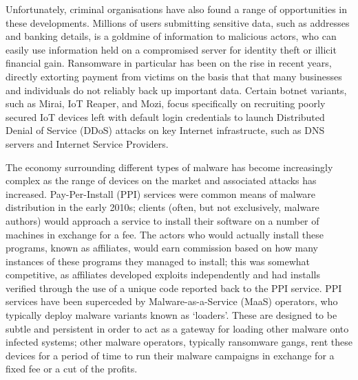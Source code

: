 \documentclass[10pt,sigconf]{acmart}
\begin{document}
Unfortunately, criminal organisations have also found a range of opportunities in these developments.
Millions of users submitting sensitive data, such as addresses and banking details, is a goldmine of information to malicious actors, who can easily use information held on a compromised server for identity theft or illicit financial gain.
Ransomware in particular has been on the rise in recent years, directly extorting payment from victims on the basis that that many businesses and individuals do not reliably back up important data.
Certain botnet variants, such as Mirai, IoT Reaper, and Mozi, focus specifically on recruiting poorly secured IoT devices left with default login credentials to launch Distributed Denial of Service (DDoS) attacks on key Internet infrastructe, such as DNS servers and Internet Service Providers.

The economy surrounding different types of malware has become increasingly complex as the range of devices on the market and associated attacks has increased.
Pay-Per-Install (PPI) services were common means of malware distribution in the early 2010s;
clients (often, but not exclusively, malware authors) would approach a service to install their software on a number of machines in exchange for a fee.
The actors who would actually install these programs, known as affiliates, would earn commission based on how many instances of these programs they managed to install;
this was somewhat competitive, as affiliates developed exploits independently and had installs verified through the use of a unique code reported back to the PPI service.
PPI services have been superceded by Malware-as-a-Service (MaaS) operators, who typically deploy malware variants known as `loaders'.
These are designed to be subtle and persistent in order to act as a gateway for loading other malware onto infected systems;
other malware operators, typically ransomware gangs, rent these devices for a period of time to run their malware campaigns in exchange for a fixed fee or a cut of the profits.
\end{document}

